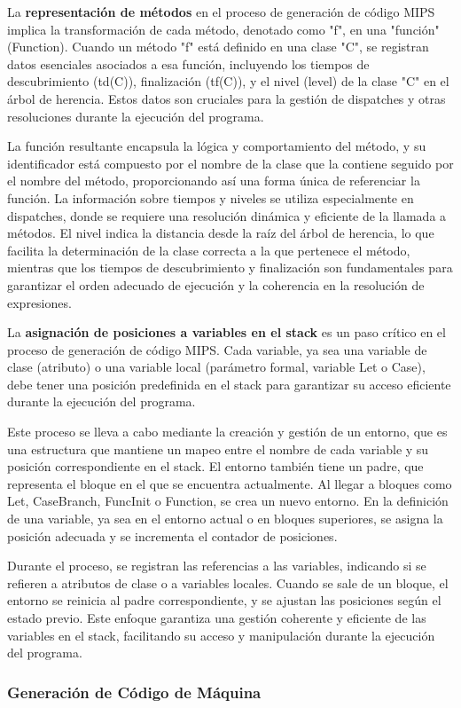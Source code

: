 \documentclass[10pt]{article} %
\begin{document}
	La \textbf{representación de métodos} en el proceso de generación de código MIPS implica la transformación de cada método, denotado como "f", en una "función" (Function). Cuando un método "f" está definido en una clase "C", se registran datos esenciales asociados a esa función, incluyendo los tiempos de descubrimiento (td(C)), finalización (tf(C)), y el nivel (level) de la clase "C" en el árbol de herencia. Estos datos son cruciales para la gestión de dispatches y otras resoluciones durante la ejecución del programa.
	
	La función resultante encapsula la lógica y comportamiento del método, y su identificador está compuesto por el nombre de la clase que la contiene seguido por el nombre del método, proporcionando así una forma única de referenciar la función. La información sobre tiempos y niveles se utiliza especialmente en dispatches, donde se requiere una resolución dinámica y eficiente de la llamada a métodos. El nivel indica la distancia desde la raíz del árbol de herencia, lo que facilita la determinación de la clase correcta a la que pertenece el método, mientras que los tiempos de descubrimiento y finalización son fundamentales para garantizar el orden adecuado de ejecución y la coherencia en la resolución de expresiones.
	
	La \textbf{asignación de posiciones a variables en el stack} es un paso crítico en el proceso de generación de código MIPS. Cada variable, ya sea una variable de clase (atributo) o una variable local (parámetro formal, variable Let o Case), debe tener una posición predefinida en el stack para garantizar su acceso eficiente durante la ejecución del programa.
	
	Este proceso se lleva a cabo mediante la creación y gestión de un entorno, que es una estructura que mantiene un mapeo entre el nombre de cada variable y su posición correspondiente en el stack. El entorno también tiene un padre, que representa el bloque en el que se encuentra actualmente. Al llegar a bloques como Let, CaseBranch, FuncInit o Function, se crea un nuevo entorno. En la definición de una variable, ya sea en el entorno actual o en bloques superiores, se asigna la posición adecuada y se incrementa el contador de posiciones.
	
	Durante el proceso, se registran las referencias a las variables, indicando si se refieren a atributos de clase o a variables locales. Cuando se sale de un bloque, el entorno se reinicia al padre correspondiente, y se ajustan las posiciones según el estado previo. Este enfoque garantiza una gestión coherente y eficiente de las variables en el stack, facilitando su acceso y manipulación durante la ejecución del programa.
	
	\subsubsection{Generaci\'on de C\'odigo de M\'aquina}
\end{document}
